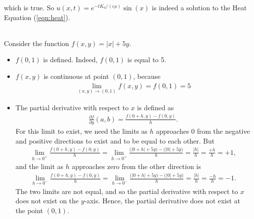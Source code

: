 which is true.  So $u(x,t) = e^{-tK_0/(c\rho)}\sin(x)$ is indeed a solution
to the Heat Equation (\ref{eqn:heat}).
\item  {}\\ 
Consider the function $f(x,y) = \big|x\big| + 5y$.
\begin{itemize}
\item $f(0,1)$ is defined. Indeed, $f(0,1)$ is equal to 5.
\item $f(x,y)$ is continuous at point $(0,1)$, because 
\begin{align*}
\lim_{(x,y) \rightarrow (0,1)} f(x,y) = f(0,1) = 5
\end{align*}
\item
The partial derivative with respect to $x$ is defined as
\begin{align*}
   \frac{\partial f}{\partial y}(a,b)= \frac{f(0+h,y)-f(0,y)}{h}.
\end{align*}
For this limit to exist, we need the limits as $h$ approaches 0 from the negative and positive directions to exist and to be equal to each other. But
\begin{align*}
\lim_{h \rightarrow 0^+} \frac{f(0+h,y)-f(0,y)}{h} = \lim_{h \rightarrow 0^+} \frac{\big(\big|0+h\big| +5y\big)-\big(\big|0\big| +5y\big)}{h} = \frac{\big|h\big|}{h} = \frac{+ h }{h} = +1,
\end{align*}
and the limit as $h$ approaches zero from the other direction is
\begin{align*}
\lim_{h \rightarrow 0^-} \frac{f(0+h,y)-f(0,y)}{h} = \lim_{h \rightarrow 0^-} \frac{\big(\big|0+h\big| +5y\big)-\big(\big|0\big| +5y\big)}{h} = \frac{\big|h\big|}{h} = \frac{- h }{h} = -1.
\end{align*}
The two limits are not equal, and so the partial derivative with respect to $x$ does not exist on the $y$-axis. Hence, the partial derivative does not exist at the point $(0,1)$. 
\end{itemize}

